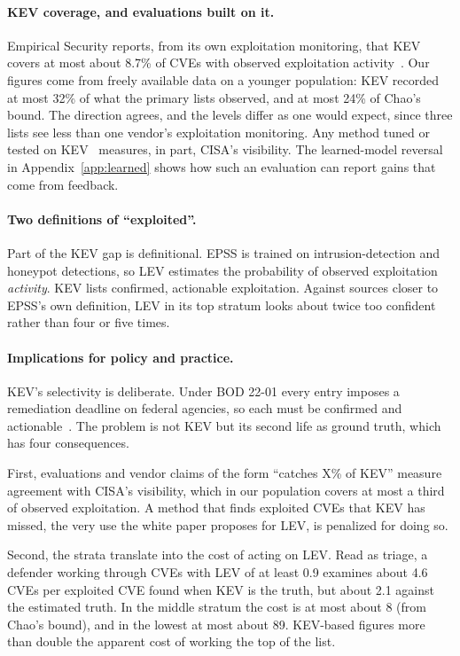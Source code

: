 \paragraph{KEV coverage, and evaluations built on it.} Empirical Security
reports, from its own exploitation monitoring, that KEV covers at most about 8.7\% of CVEs
with observed exploitation activity~\cite{roytman2026kevparadox}. Our figures
come from freely available data on a younger population: KEV recorded at most 32\% of what
the primary lists observed, and at most 24\% of Chao's bound. The direction
agrees, and the levels differ as one would expect, since three lists see less
than one vendor's exploitation monitoring. Any method tuned or tested on
KEV~\cite{shimizu2026chaining,sherif2026kri,motamedi2026threatlens} measures,
in part, CISA's visibility. The learned-model reversal in
Appendix~\ref{app:learned} shows how such an evaluation can report gains that
come from feedback.

\paragraph{Two definitions of ``exploited''.} Part of the KEV gap is
definitional. EPSS is trained on intrusion-detection and honeypot detections,
so LEV estimates the probability of observed exploitation \emph{activity}. KEV
lists confirmed, actionable exploitation. Against sources closer to EPSS's own
definition, LEV in its top stratum looks about twice too confident rather than
four or five times.

\paragraph{Implications for policy and practice.} KEV's selectivity is
deliberate. Under BOD 22-01 every entry imposes a remediation deadline on
federal agencies, so each must be confirmed and actionable~\cite{cisa2022kev}.
The problem is not KEV but its second life as ground truth, which has four
consequences.

First, evaluations and vendor claims of the form ``catches X\% of KEV''
measure agreement with CISA's visibility, which in our population covers at most
a third of observed exploitation. A method that finds exploited CVEs that KEV
has missed, the very use the white paper proposes for LEV, is penalized for
doing so.

Second, the strata translate into the cost of acting on LEV. Read as triage, a
defender working through CVEs with LEV of at least 0.9 examines about 4.6 CVEs
per exploited CVE found when KEV is the truth, but about 2.1 against the
estimated truth. In the middle stratum the cost is at most about 8 (from Chao's
bound), and in the lowest at most about 89. KEV-based figures more than double
the apparent cost of working the top of the list.

